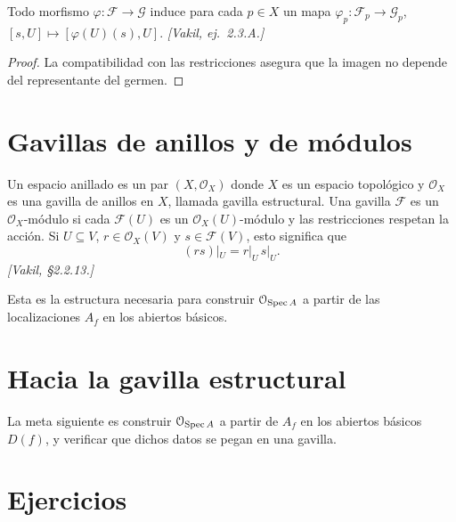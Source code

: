 \begin{prop}
\label{prop:s04-morfismo-induce-mapas-tallos}
Todo morfismo $\varphi\colon \mathcal F\to\mathcal G$ induce para cada $p\in X$ un mapa $\varphi_p\colon \mathcal F_p\to\mathcal G_p$, $[s,U]\mapsto[\varphi(U)(s),U]$. \emph{[Vakil, ej.~2.3.A.]}
\end{prop}
\begin{proof}
La compatibilidad con las restricciones asegura que la imagen no depende del representante del germen.
\end{proof}

\section{Gavillas de anillos y de módulos}

\begin{defi}
\label{defi:s04-espacio-anillado}
Un espacio anillado es un par $(X,\mathcal O_X)$ donde $X$ es un espacio topológico y $\mathcal O_X$ es una gavilla de anillos en $X$, llamada gavilla estructural. Una gavilla $\mathcal F$ es un $\mathcal O_X$-módulo si cada $\mathcal F(U)$ es un $\mathcal O_X(U)$-módulo y las restricciones respetan la acción. Si $U\subseteq V$, $r\in\mathcal O_X(V)$ y $s\in\mathcal F(V)$, esto significa que
\[
(rs)|_U=r|_U\,s|_U.
\]
\emph{[Vakil, \S2.2.13.]}
\end{defi}

\begin{obs}
\label{obs:s04-estructura-necesaria-construir-o-partir}
Esta es la estructura necesaria para construir $\mathcal O_{\operatorname{Spec} A}$ a partir de las localizaciones $A_f$ en los abiertos básicos.
\end{obs}

\section{Hacia la gavilla estructural}

La meta siguiente es construir $\mathcal O_{\operatorname{Spec} A}$ a partir de $A_f$ en los abiertos básicos $D(f)$, y verificar que dichos datos se pegan en una gavilla.

\section{Ejercicios}

